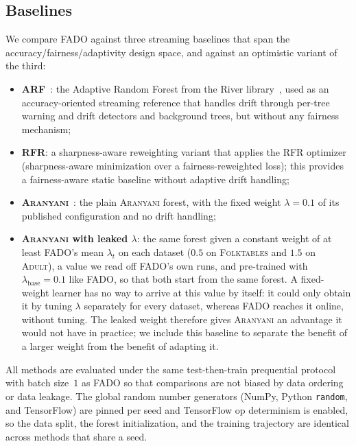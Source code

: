 \documentclass[conference]{IEEEtran}
\newcommand{\fado}{\textsc{FADO}}
\newcommand{\ara}{\textsc{Aranyani}}
\newcommand{\arf}{\textsc{ARF}}
\newcommand{\rfr}{\textsc{RFR}}
\newcommand{\adult}{\textsc{Adult}}
\newcommand{\folk}{\textsc{Folktables}}
\begin{document}
\subsection{Baselines}
\label{sec:method:baselines}
We compare \fado{} against three streaming baselines that span the 
accuracy/fairness/adaptivity design space, and against an optimistic variant of the third:
\begin{itemize}
\item \textbf{\arf{}}~\cite{10.1007/s10994-017-5642-8}: the Adaptive Random Forest 
from the River library~\cite{montiel2020rivermachinelearningstreaming}, used as an accuracy-oriented
streaming reference that handles drift through per-tree warning and drift detectors 
and background trees, but without any fairness mechanism;
\item \textbf{\rfr{}}: a sharpness-aware reweighting variant that applies the \rfr{} 
optimizer~\cite{jiang2023chasingfairnessdistributionshift} (sharpness-aware
minimization over a fairness-reweighted loss); this provides a fairness-aware static 
baseline without adaptive drift handling;
\item \textbf{\ara{}}~\cite{chowdhury2024enhancing}: the plain \ara{} forest, with the fixed weight $\lambda=0.1$ of its published configuration and
no drift handling;
\item \textbf{\ara{} with leaked $\lambda$}: the same forest given a constant weight of at least \fado{}'s mean $\lambda_t$ on each dataset ($0.5$ on \folk{}
and $1.5$ on \adult{}), a value we read off \fado{}'s own runs, and pre-trained with $\lambda_{\mathrm{base}}=0.1$ like \fado{}, so that both start from the same
forest. A fixed-weight learner has no way to arrive at this value by itself: it could only obtain it by tuning $\lambda$ separately for every dataset, whereas
\fado{} reaches it online, without tuning. The leaked weight therefore gives \ara{} an advantage it would not have in practice; we include this baseline to
separate the benefit of a larger weight from the benefit of adapting it.
\end{itemize}
All methods are evaluated under the same test-then-train prequential protocol with batch size~$1$ as \fado{} so that comparisons are not biased by data ordering
or data leakage. The global random number generators (NumPy, 
Python \texttt{random}, and TensorFlow) are pinned per seed and TensorFlow op
determinism is enabled, so the data split, the forest initialization, and the 
training trajectory are identical across methods that share a seed.
\end{document}

